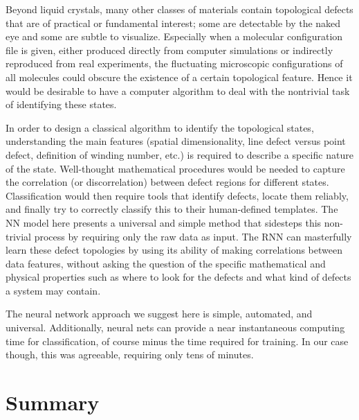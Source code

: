 Beyond liquid crystals, many other classes of materials contain topological defects that are of practical or fundamental interest; some are detectable by the naked eye and some are subtle to visualize. Especially when a molecular configuration file is given, either produced directly from computer simulations or indirectly reproduced from real experiments, the fluctuating microscopic configurations of all molecules could obscure the existence of a certain topological feature. Hence it would be desirable to have a computer algorithm to deal with the nontrivial task of identifying these states.

In order to design a classical algorithm to identify the topological states, understanding the main features (spatial dimensionality, line defect versus point defect, definition of winding number, etc.) is required to describe a specific nature of the state. Well-thought mathematical procedures would be needed to capture the correlation (or discorrelation) between defect regions for different states.
Classification would then require tools that identify defects, locate them reliably, and finally try to correctly classify this to their human-defined templates.
The NN model here presents a universal and simple method that sidesteps this non-trivial process by requiring only the raw data as input. 
The RNN can masterfully learn these defect topologies by using its ability of making correlations between data features, without asking the question of the specific mathematical and physical properties such as where to look for the defects and what kind of defects a system may contain.

The neural network approach we suggest here is simple, automated, and universal.
Additionally, neural nets can provide a near instantaneous computing time for classification, of course minus the time required for training. In our case though, this was agreeable, requiring only tens of minutes.


\section{Summary}

